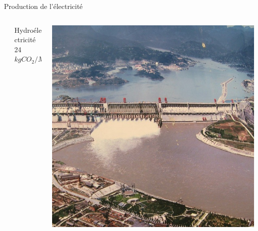 \documentclass{beamer}
\begin{document}
\begin{frame}{Production de l'électricité}
\begin{columns}
\begin{column}{0.2\textwidth}
\end{column}
\begin{column}{0.25\textwidth}
Hydroélectricité\\
24 $kgCO_2/MWh$
\end{column}
\begin{column}{0.2\textwidth}
  \includegraphics[scale=0.1]{images/3_gorges.jpg}
\end{column}
\end{columns}
\end{frame}
\end{document}
